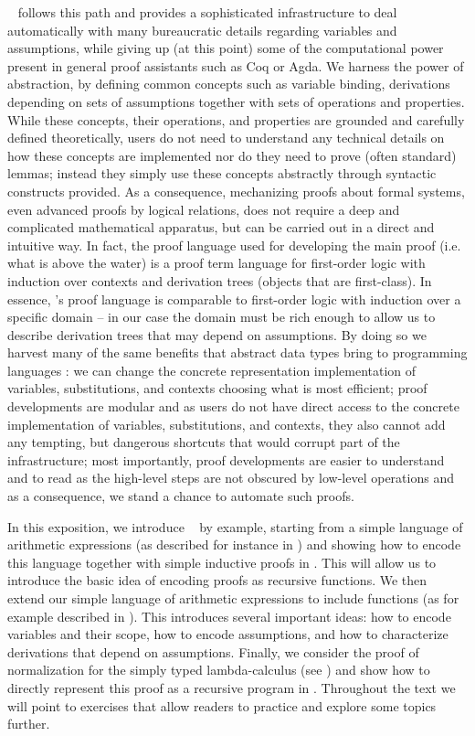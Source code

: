 \beluga~\citep{Pientka:IJCAR10,Pientka:CADE15} follows this path and provides a sophisticated infrastructure to deal automatically with many bureaucratic details regarding variables and  assumptions, while giving up  (at this point) some of the computational power present in general proof assistants such as Coq or Agda.  We harness the power of abstraction, by defining common concepts such as variable binding, derivations depending on sets of assumptions together with sets of operations and properties. While these concepts, their operations, and properties are grounded and carefully defined theoretically, users do not need to understand any technical details on how these concepts are implemented nor do they need to prove (often standard) lemmas;  instead they simply use these concepts abstractly through syntactic constructs provided. As a consequence, mechanizing proofs about formal systems, even advanced proofs by logical relations, does not require a deep and complicated mathematical apparatus, but can be carried out in a direct and intuitive way.  In fact, the proof language used for developing the main proof (i.e. what is above the water) is a proof term language for first-order logic with induction over contexts and derivation trees (objects that are first-class). In essence, \beluga's proof language is comparable to first-order logic with induction over a specific domain -- in our case the domain must be rich enough to allow us to describe derivation trees that may depend on assumptions. By doing so we harvest many of the same benefits that abstract data types bring to programming languages \citep{Liskov:74}: we can change the concrete representation implementation of variables, substitutions, and contexts choosing what is most efficient;  proof developments are modular and as users do not have direct access to the concrete implementation of variables, substitutions, and contexts, they also cannot add any tempting, but dangerous shortcuts that would corrupt part of the infrastructure; most importantly, proof developments are easier to understand and to read as the high-level steps are not obscured by low-level operations and as a consequence, we stand a chance to automate such proofs.

In this exposition, we introduce \beluga~ by example, starting from a simple language of arithmetic expressions (as described for instance in \cite[Ch 3, Ch 8]{TAPL}) and showing how to encode this language together with simple inductive proofs  in \beluga. This will allow us to introduce the basic idea of encoding proofs as recursive functions. We then extend our simple language of arithmetic expressions to include functions (as for example described in \cite[Ch 5, Ch 9]{TAPL}). This introduces several important ideas: how to encode variables and their scope, how to encode assumptions, and how to characterize derivations that depend on assumptions. Finally, we consider the proof of normalization for the simply typed lambda-calculus (see \cite[Ch 12]{TAPL}) and show how to directly represent this proof as a recursive program in \beluga. Throughout the text we will point to exercises that allow readers to practice and explore some topics further.

